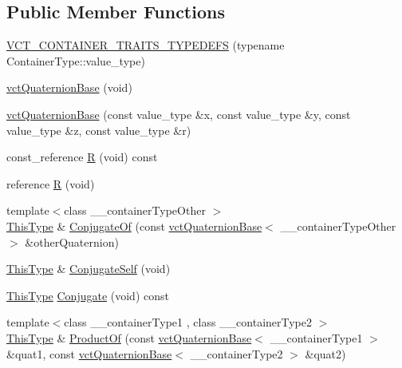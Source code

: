 \subsection*{Public Member Functions}
\begin{DoxyCompactItemize}
\item 
\hyperlink{classvct_quaternion_base_a6d50f34b12456a9ddabffcfe1e7163fa}{V\-C\-T\-\_\-\-C\-O\-N\-T\-A\-I\-N\-E\-R\-\_\-\-T\-R\-A\-I\-T\-S\-\_\-\-T\-Y\-P\-E\-D\-E\-F\-S} (typename Container\-Type\-::value\-\_\-type)
\item 
\hyperlink{classvct_quaternion_base_aa12f1dbce4f6951b7f5dbf152ab36451}{vct\-Quaternion\-Base} (void)
\item 
\hyperlink{classvct_quaternion_base_a74b7ff30dbf7795327422e6ad84dd3be}{vct\-Quaternion\-Base} (const value\-\_\-type \&x, const value\-\_\-type \&y, const value\-\_\-type \&z, const value\-\_\-type \&r)
\item 
const\-\_\-reference \hyperlink{classvct_quaternion_base_a5442f4bf5bb477002a83cfab0fe9a22d}{R} (void) const 
\item 
reference \hyperlink{classvct_quaternion_base_ae6bd16f152498430ca36ba19b816827e}{R} (void)
\item 
{\footnotesize template$<$class \-\_\-\-\_\-container\-Type\-Other $>$ }\\\hyperlink{classvct_quaternion_base_af28efdc38acf89acb7a67afada11408c}{This\-Type} \& \hyperlink{classvct_quaternion_base_ab9b4820ec33d504f116391dadd89ee55}{Conjugate\-Of} (const \hyperlink{classvct_quaternion_base}{vct\-Quaternion\-Base}$<$ \-\_\-\-\_\-container\-Type\-Other $>$ \&other\-Quaternion)
\item 
\hyperlink{classvct_quaternion_base_af28efdc38acf89acb7a67afada11408c}{This\-Type} \& \hyperlink{classvct_quaternion_base_a9090e2ae7e74eeb0cb980ba68f4e25d1}{Conjugate\-Self} (void)
\item 
\hyperlink{classvct_quaternion_base_af28efdc38acf89acb7a67afada11408c}{This\-Type} \hyperlink{classvct_quaternion_base_a5cb5a8f47aedbdb9a7dc690b42ee8023}{Conjugate} (void) const 
\item 
{\footnotesize template$<$class \-\_\-\-\_\-container\-Type1 , class \-\_\-\-\_\-container\-Type2 $>$ }\\\hyperlink{classvct_quaternion_base_af28efdc38acf89acb7a67afada11408c}{This\-Type} \& \hyperlink{classvct_quaternion_base_a00862717f38d8070a59e5ac3566332d3}{Product\-Of} (const \hyperlink{classvct_quaternion_base}{vct\-Quaternion\-Base}$<$ \-\_\-\-\_\-container\-Type1 $>$ \&quat1, const \hyperlink{classvct_quaternion_base}{vct\-Quaternion\-Base}$<$ \-\_\-\-\_\-container\-Type2 $>$ \&quat2)

\end{DoxyCompactItemize}
